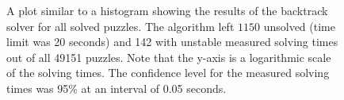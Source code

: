 \documentclass[a4paper,11pt]{kth-mag}
\begin{document}
\begin{figure}[here] 
\noindent{}
\vspace{-15pt}
\caption[Plot of backtrack results]{A plot similar to a histogram showing the results of the backtrack solver for all solved puzzles. The algorithm left $1150$ unsolved (time limit was 20 seconds) and 142 with unstable measured solving times out of all 49151 puzzles. Note that the y-axis is a logarithmic scale of the solving times. The confidence level for the measured solving times was 95\% at an interval of 0.05 seconds.}
\label{fig:backtrackDistribution}
\end{figure}
\end{document}
